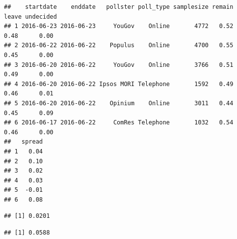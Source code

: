 \documentclass[
]{article}
\newenvironment{Shaded}{\begin{snugshade}}{\end{snugshade}}
\newcommand{\CommentTok}[1]{\textcolor[rgb]{0.56,0.35,0.01}{\textit{#1}}}
\newcommand{\DataTypeTok}[1]{\textcolor[rgb]{0.13,0.29,0.53}{#1}}
\newcommand{\DecValTok}[1]{\textcolor[rgb]{0.00,0.00,0.81}{#1}}
\newcommand{\KeywordTok}[1]{\textcolor[rgb]{0.13,0.29,0.53}{\textbf{#1}}}
\newcommand{\NormalTok}[1]{#1}
\newcommand{\OperatorTok}[1]{\textcolor[rgb]{0.81,0.36,0.00}{\textbf{#1}}}
\newcommand{\StringTok}[1]{\textcolor[rgb]{0.31,0.60,0.02}{#1}}
\begin{document}
\begin{verbatim}
##    startdate    enddate   pollster poll_type samplesize remain leave undecided
## 1 2016-06-23 2016-06-23     YouGov    Online       4772   0.52  0.48      0.00
## 2 2016-06-22 2016-06-22    Populus    Online       4700   0.55  0.45      0.00
## 3 2016-06-20 2016-06-22     YouGov    Online       3766   0.51  0.49      0.00
## 4 2016-06-20 2016-06-22 Ipsos MORI Telephone       1592   0.49  0.46      0.01
## 5 2016-06-20 2016-06-22    Opinium    Online       3011   0.44  0.45      0.09
## 6 2016-06-17 2016-06-22     ComRes Telephone       1032   0.54  0.46      0.00
##   spread
## 1   0.04
## 2   0.10
## 3   0.02
## 4   0.03
## 5  -0.01
## 6   0.08
\end{verbatim}

\begin{Shaded}
\end{Shaded}

\begin{verbatim}
## [1] 0.0201
\end{verbatim}

\begin{Shaded}
\end{Shaded}

\begin{verbatim}
## [1] 0.0588
\end{verbatim}

\begin{Shaded}
\end{Shaded}
\end{document}
